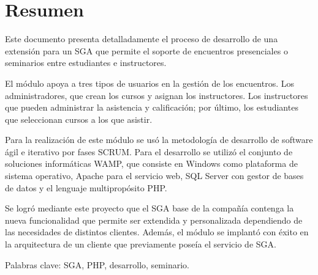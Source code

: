 \chapter*{Resumen}

Este documento presenta detalladamente el proceso de desarrollo de una extensión para un \gls{SGA} que permite el soporte de encuentros presenciales o seminarios entre estudiantes e instructores. 

El módulo apoya a tres tipos de usuarios en la gestión de los encuentros. Los administradores, que crean los cursos y asignan los instructores. Los instructores que pueden administrar la asistencia y calificación; por último, los estudiantes que seleccionan cursos a los que asistir.

Para la realización de este módulo se usó la metodología de desarrollo de software ágil e iterativo por fases SCRUM. Para el desarrollo se utilizó el conjunto de soluciones informáticas WAMP, que consiste en Windows como plataforma de sistema operativo, Apache para el servicio web, \gls{SQL} Server con gestor de bases de datos y el lenguaje multipropósito PHP.

Se logró mediante este proyecto que el SGA base de la compañía contenga la nueva funcionalidad que permite ser extendida y personalizada dependiendo de las necesidades de distintos clientes. Además, el módulo se implantó con éxito en la arquitectura de un cliente que previamente poseía el servicio de \gls{SGA}.

Palabras clave: \gls{SGA}, \gls{PHP}, desarrollo, seminario.




